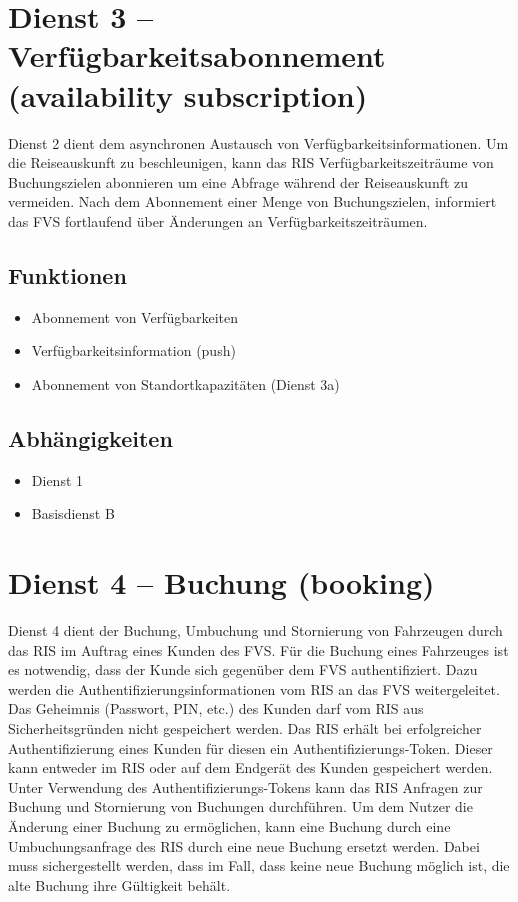 \section{Dienst 3 -- Verfügbarkeitsabonnement (availability subscription) }
\label{sec:Hierachiemodell:Dienst3}
Dienst 2 dient dem asynchronen Austausch von Verfügbarkeitsinformationen. Um die Reiseauskunft zu beschleunigen, kann das RIS Verfügbarkeitszeiträume von Buchungszielen abonnieren um eine Abfrage während der Reiseauskunft zu vermeiden. Nach dem Abonnement einer Menge von Buchungszielen, informiert das FVS fortlaufend über Änderungen an Verfügbarkeitszeiträumen.

\subsection*{Funktionen}
\begin{itemize}
\item Abonnement von Verfügbarkeiten
\item Verfügbarkeitsinformation (push)
\item Abonnement von Standortkapazitäten (Dienst 3a)
\end{itemize}

\subsection*{Abhängigkeiten}
\begin{itemize}
\item Dienst 1
\item Basisdienst B
\end{itemize}


\section{Dienst 4 -- Buchung (booking)}
\label{sec:Hierachiemodell:Dienst4}
Dienst 4 dient der Buchung, Umbuchung und Stornierung von Fahrzeugen durch das RIS im Auftrag eines Kunden des FVS. Für die Buchung eines Fahrzeuges ist es notwendig, dass der Kunde sich gegenüber dem FVS authentifiziert. Dazu werden die Authentifizierungsinformationen vom RIS an das FVS weitergeleitet. Das Geheimnis (Passwort, PIN, etc.) des Kunden darf vom RIS aus Sicherheitsgründen nicht gespeichert werden. Das RIS erhält bei erfolgreicher Authentifizierung eines Kunden für diesen ein Authentifizierungs-Token. Dieser kann entweder im RIS oder auf dem Endgerät des Kunden gespeichert werden. Unter Verwendung des Authentifizierungs-Tokens kann das RIS Anfragen zur Buchung und Stornierung von Buchungen durchführen.  Um dem Nutzer die Änderung einer Buchung zu ermöglichen, kann eine Buchung durch eine Umbuchungsanfrage des RIS durch eine neue Buchung ersetzt werden. Dabei muss sichergestellt werden, dass im Fall, dass keine neue Buchung möglich ist, die alte Buchung ihre Gültigkeit behält.

